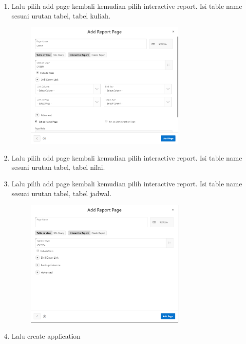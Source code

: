 \begin{enumerate}
\begin{figure}[h]
        \end{figure}
    \item Lalu pilih add page kembali kemudian pilih interactive report. Isi table name sesuai urutan tabel, tabel kuliah.
        \begin{figure}[h]
        \centerline{\includegraphics[width=8cm]{Figures/addpagedosen.PNG}}
        \end{figure}
    \item Lalu pilih add page kembali kemudian pilih interactive report. Isi table name sesuai urutan tabel, tabel nilai.
    \item Lalu pilih add page kembali kemudian pilih interactive report. Isi table name sesuai urutan tabel, tabel jadwal.
        \begin{figure}[h]
        \centerline{\includegraphics[width=8cm]{Figures/addpagejadwal.PNG}}
        \end{figure}
    \item Lalu create application

\end{enumerate}
